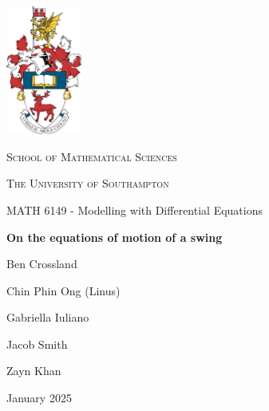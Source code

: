 \documentclass[12pt]{article}
\begin{document}


\begin{titlepage}
    \centering
    \includegraphics[width=2.5cm]{Figures/crest.jpg}\par
    \vspace{0.5cm}
    {\scshape\Large School of Mathematical Sciences \par}
    \vspace{0.25cm}
    {\scshape\Large The University of Southampton \par}
    \vspace{0.25cm}
    {\Large MATH 6149 - Modelling with Differential Equations \par}
    \vspace{1cm}
    {\huge\bfseries On the equations of motion of a swing\par}
    \vspace{1cm}
    {\Large Ben Crossland \par}
    \vspace{0.25cm}
    {\Large Chin Phin Ong (Linus) \par}
    \vspace{0.25cm}
    {\Large Gabriella Iuliano\par} %
    \vspace{0.25cm}
    {\Large Jacob Smith \par}
    \vspace{0.25cm}
    {\Large Zayn Khan \par}
    \vspace{0.25cm}
    {\large  \par}
    \vfill
    {\large January 2025 \par}
\end{titlepage}
\end{document}
